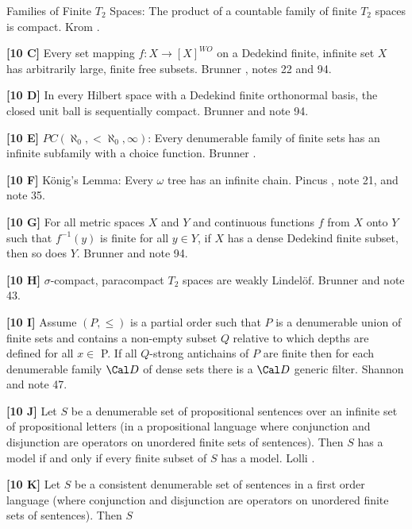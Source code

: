 Families of Finite $T_2$ Spaces: The product of a countable family of
finite $T_2$ spaces is compact.  \ac{Krom} \cite{1981}.
\smallskip
\item{}{\bf [10 C]}  Every set mapping $f: X\rightarrow [X]^{WO}$ on a
Dedekind finite, infinite set $X$ has arbitrarily large, finite free
subsets.  \ac{Brunner} \cite{1989}, notes 22 and 94.
\smallskip
\item{}{\bf [10 D]}  In every Hilbert space with a Dedekind finite
orthonormal basis, the closed unit ball is sequentially
compact.  \ac{Brunner} \cite{1983b} and note 94.
\smallskip
\item{}{\bf [10 E]}  $PC(\aleph_{0},< \aleph_{0},\infty)$:  Every
denumerable family of finite  sets  has  an  infinite
subfamily  with  a  choice function.  \ac{Brunner} \cite{1983b}.
\smallskip
\item{}{\bf [10 F]}  K\"onig's Lemma:  Every $\omega$ tree has an
infinite chain.  \ac{Pincus} \cite{1972c}, note 21, and note 35.
\smallskip
\item{}{\bf [10 G]}  For all metric spaces $X$ and $Y$ and continuous
functions $f$ from $X$ onto $Y$ such that $f^{-1}(y)$ is finite for all
$y\in Y$, if $X$ has  a dense Dedekind finite subset, then so does $Y$.
\ac{Brunner} \cite{1982d} and note 94.
\smallskip
\item{}{\bf [10 H]} $\sigma$-compact, paracompact $T_2$ spaces are
weakly Lindel\"of.  \ac{Brunner} \cite{1982b} and note 43.
\smallskip
\item{}{\bf [10 I]}  Assume $(P,\le)$ is a partial order such that $P$
is a denumerable union of finite sets and contains a non-empty subset
$Q$ relative to which depths are defined for all $x\in $ P. If  all
$Q$-strong antichains of $P$ are finite then for each denumerable
family ${\Cal D}$ of dense sets there is a ${\Cal D}$ generic filter.
\ac{Shannon} \cite{1990} and note 47.
\smallskip
\item{}{\bf [10 J]} Let $S$ be a denumerable set of propositional
sentences over an infinite set of propositional letters (in a
propositional language where conjunction and disjunction are operators
on unordered finite sets of sentences).  Then $S$ has a model if and
only if every finite subset of $S$ has a model.  \ac{Lolli} \cite{1977}.
\smallskip
\item{}{\bf [10 K]} Let $S$ be a consistent denumerable set of sentences
in a first order language (where conjunction and disjunction are
operators on unordered finite sets of sentences).  Then $S$
